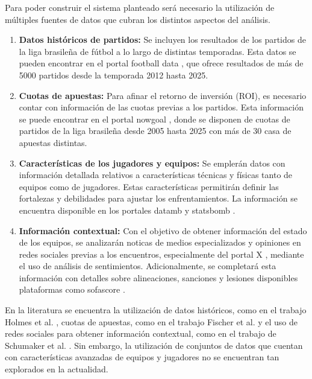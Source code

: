 Para poder construir el sistema planteado será necesario la utilización de múltiples fuentes de datos que cubran los distintos aspectos del análisis.

\begin{enumerate}
    \item \textbf{Datos históricos de partidos:} Se incluyen los resultados de los partidos de la liga brasileña de fútbol a lo largo de distintas temporadas. Esta datos se pueden encontrar en el portal football data \cite{footballData}, que ofrece resultados de más de 5000 partidos desde la temporada 2012 hasta 2025.

    \item \textbf{Cuotas de apuestas:} Para afinar el retorno de inversión (ROI), es necesario contar con información de las cuotas previas a los partidos. Esta información se puede encontrar en el portal nowgoal \cite{nowgoalOdds}, donde se disponen de cuotas de partidos de la liga brasileña desde 2005 hasta 2025 con más de 30 casa de apuestas distintas.
    
    \item \textbf{Características de los jugadores y equipos:} Se emplerán datos con información detallada relativos a características técnicas y físicas tanto de equipos como de jugadores. Estas características permitirán definir las fortalezas y debilidades para ajustar los enfrentamientos. La información se encuentra disponible en los portales datamb \cite{datamb} y statsbomb \cite{statsbomb}.
    \item \textbf{Información contextual:} Con el objetivo de obtener información del estado de los equipos, se analizarán noticas de medios especializados y opiniones en redes sociales previas a los encuentros, especialmente del portal X \cite{twitter}, mediante el uso de análisis de sentimientos. Adicionalmente, se completará esta información con detalles sobre alineaciones, sanciones y lesiones disponibles plataformas como sofascore \cite{sofascore}.
\end{enumerate}

En la literatura se encuentra la utilización de datos históricos, como en el trabajo Holmes et al. \cite{holmesForecastingFootballMatch2024}, cuotas de apuestas, como en el trabajo Fischer et al. \cite{Fisher2024PricingResponse} y el uso de redes sociales para obtener información contextual, como en el trabajo de Schumaker et al. \cite{Schumaker2016}. Sin embargo, la utilización de conjuntos de datos que cuentan con características avanzadas de equipos y jugadores no se encuentran tan explorados en la actualidad.

